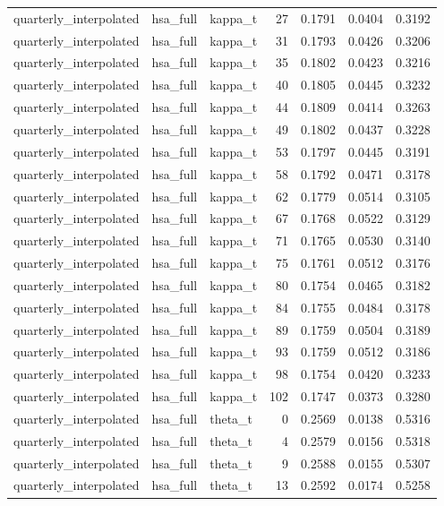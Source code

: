 \begin{tabular}{lllrrrr}
quarterly\_interpolated & hsa\_full & kappa\_t & 27 & 0.1791 & 0.0404 & 0.3192 \\
quarterly\_interpolated & hsa\_full & kappa\_t & 31 & 0.1793 & 0.0426 & 0.3206 \\
quarterly\_interpolated & hsa\_full & kappa\_t & 35 & 0.1802 & 0.0423 & 0.3216 \\
quarterly\_interpolated & hsa\_full & kappa\_t & 40 & 0.1805 & 0.0445 & 0.3232 \\
quarterly\_interpolated & hsa\_full & kappa\_t & 44 & 0.1809 & 0.0414 & 0.3263 \\
quarterly\_interpolated & hsa\_full & kappa\_t & 49 & 0.1802 & 0.0437 & 0.3228 \\
quarterly\_interpolated & hsa\_full & kappa\_t & 53 & 0.1797 & 0.0445 & 0.3191 \\
quarterly\_interpolated & hsa\_full & kappa\_t & 58 & 0.1792 & 0.0471 & 0.3178 \\
quarterly\_interpolated & hsa\_full & kappa\_t & 62 & 0.1779 & 0.0514 & 0.3105 \\
quarterly\_interpolated & hsa\_full & kappa\_t & 67 & 0.1768 & 0.0522 & 0.3129 \\
quarterly\_interpolated & hsa\_full & kappa\_t & 71 & 0.1765 & 0.0530 & 0.3140 \\
quarterly\_interpolated & hsa\_full & kappa\_t & 75 & 0.1761 & 0.0512 & 0.3176 \\
quarterly\_interpolated & hsa\_full & kappa\_t & 80 & 0.1754 & 0.0465 & 0.3182 \\
quarterly\_interpolated & hsa\_full & kappa\_t & 84 & 0.1755 & 0.0484 & 0.3178 \\
quarterly\_interpolated & hsa\_full & kappa\_t & 89 & 0.1759 & 0.0504 & 0.3189 \\
quarterly\_interpolated & hsa\_full & kappa\_t & 93 & 0.1759 & 0.0512 & 0.3186 \\
quarterly\_interpolated & hsa\_full & kappa\_t & 98 & 0.1754 & 0.0420 & 0.3233 \\
quarterly\_interpolated & hsa\_full & kappa\_t & 102 & 0.1747 & 0.0373 & 0.3280 \\
quarterly\_interpolated & hsa\_full & theta\_t & 0 & 0.2569 & 0.0138 & 0.5316 \\
quarterly\_interpolated & hsa\_full & theta\_t & 4 & 0.2579 & 0.0156 & 0.5318 \\
quarterly\_interpolated & hsa\_full & theta\_t & 9 & 0.2588 & 0.0155 & 0.5307 \\
quarterly\_interpolated & hsa\_full & theta\_t & 13 & 0.2592 & 0.0174 & 0.5258 \\

\end{tabular}
